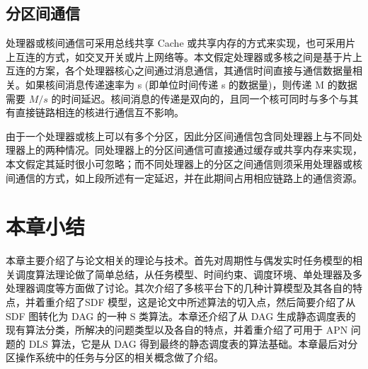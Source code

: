 \subsection{分区间通信}
\label{basic-partition-message}

处理器或核间通信可采用总线共享 Cache 或共享内存的方式来实现，也可采用片上互连的方式，如交叉开关或片上网络等。本文假定处理器或多核之间是基于片上互连的方案，各个处理器核心之间通过消息通信，其通信时间直接与通信数据量相关。如果核间消息传递速率为 s (即单位时间传递 s 的数据量)，则传递 M 的数据需要 $M/s$ 的时间延迟。核间消息的传递是双向的，且同一个核可同时与多个与其有直接链路相连的核进行通信互不影响。

由于一个处理器或核上可以有多个分区，因此分区间通信包含同处理器上与不同处理器上的两种情况。同处理器上的分区间通信可直接通过缓存或共享内存来实现，本文假定其延时很小可忽略；而不同处理器上的分区之间通信则须采用处理器或核间通信的方式，如上段所述有一定延迟，并在此期间占用相应链路上的通信资源。

\section{本章小结}

本章主要介绍了与论文相关的理论与技术。首先对周期性与偶发实时任务模型的相关调度算法理论做了简单总结，从任务模型、时间约束、调度环境、单处理器及多处理器调度等方面做了讨论。其次介绍了多核平台下的几种计算模型及其各自的特点，并着重介绍了SDF 模型，这是论文中所述算法的切入点，然后简要介绍了从 SDF 图转化为 DAG 的一种 S 类算法。本章还介绍了从 DAG 生成静态调度表的现有算法分类，所解决的问题类型以及各自的特点，并着重介绍了可用于 APN 问题的 DLS 算法，它是从 DAG 得到最终的静态调度表的算法基础。本章最后对分区操作系统中的任务与分区的相关概念做了介绍。

